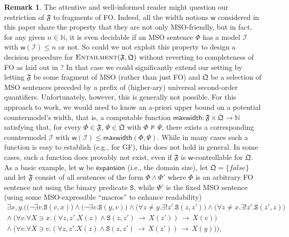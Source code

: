 \documentclass[10pt,a4paper]{amsart}
\theoremstyle{definition}
\newtheorem{rem}[rem]{Remark}
\numberwithin{equation}{section}
\theoremstyle{plain}
\theoremstyle{definition}
\newtheorem{remark}[remark]{Remark}
\theoremstyle{myexample}
\renewenvironment{remark}%
{
	\begin{shaded*}	
		\vspace{-1.5ex}
		\begin{rem}%
		}{
		\end{rem}
		\vspace{-1.5ex}
	\end{shaded*}
}
\theoremstyle{plain}
\theoremstyle{definition}
\newcommand{\fcn}[1]{\mathsf{#1}}
\newcommand{\pred}[1]{\mathtt{#1}}
\begin{document}
\begin{remark}
The attentive and well-informed reader might question our restriction of $\mathfrak{F}$ to fragments of FO. Indeed, all the width notions $\fcn{w}$ considered in this paper share the property that they are not only MSO-friendly, but in fact, for any given $n \in \mathbb{N}$, it is even decidable if an MSO sentence $\Phi$ has a model $\mathcal{I}$ with $\fcn{w}(\mathcal{I})\leq n$ or not. So could we not exploit this property to design a decision procedure for $\textsc{Entailment}(\mathfrak{F},\mathfrak{Q})$ without reverting to completeness of FO as laid out in ? In that case we could significantly extend our setting by letting $\mathfrak{F}$ be some fragment of MSO (rather than just FO) and $\mathfrak{Q}$ be a selection of MSO sentences preceded by a prefix of (higher-ary) universal second-order quantifiers. Unfortunately, however, this is generally not possible. For this approach to work, we would need to know an a-priori upper bound on a potential countermodel's width, that is, a computable function $\fcn{maxwidth}: \mathfrak{F} \times \mathfrak{Q} \to \mathbb{N}$ satisfying that, for every $\Phi \in \mathfrak{F}$, $\Psi \in \mathfrak{Q}$ with $\Phi \not\models\Psi$, there exists a corresponding countermodel $\mathcal{I}$ with $\fcn{w}(\mathcal{I})\leq \fcn{maxwidth}(\Phi,\Psi)$. While in many cases such a function is easy to establish (e.g., for GF), this does not hold in general. In some cases, such a function does provably not exist, even if $\mathfrak{F}$ is $\fcn{w}$-controllable for $\mathfrak{Q}$. As a basic example, let $\fcn{w}$ be $\fcn{expansion}$ (i.e., the domain size), let $\mathfrak{Q} = \{\mathit{false}\}$ and let $\mathfrak{F}$ consist of all sentences of the form $\Phi \wedge \Phi'$ where $\Phi$ is an arbitrary FO sentence not using the binary predicate $\pred{S}$, while $\Phi'$ is the fixed MSO sentence (using some MSO-expressible ``macros'' to enhance readability)
$$
\begin{array}{r}
\exists x,y.\Big( \big(\neg \exists v.\pred{S}(v,x)\big) \wedge \big(\neg \exists v.\pred{S}(y,v)\big) \wedge  \big(\forall z {\not=} y. \exists ! z'. \pred{S}(z,z')\big) \wedge \big(\forall z {\not=} x. \exists ! z'. \pred{S}(z',z)\big)\quad \\
\wedge\ \big(\forall v. \forall X {\ni} x. (\forall z,z'. X(z) \wedge \pred{S}(z,z') \,{\to}\, X(z')) \, \to \, X(v) \big)\quad \\
\wedge\ \big(\forall v. \forall X {\ni} v. (\forall z,z'. X(z) \wedge \pred{S}(z,z') \,{\to}\, X(z')) \, \to \, X(y) \big)\Big), \\

\end{array}$$
\end{remark}
\end{document}
